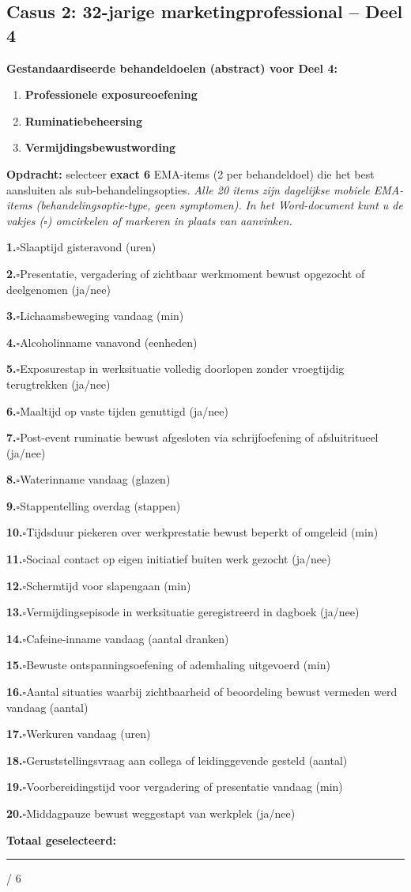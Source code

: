\documentclass[11pt,a4paper]{article}
\newcommand{\checkitemBFS}[2]{%
\noindent\small\textbf{#1.}\hspace{0.45em}$\square$\hspace{0.4em}#2\par\vspace{0.20em}}
\begin{document}
\vspace{0.6em}
\newpage
\subsection*{Casus 2: 32-jarige marketingprofessional -- Deel 4}

\begin{contextbox}
\small\textbf{Gestandaardiseerde behandeldoelen (abstract) voor Deel 4:}
\begin{enumerate}[topsep=2pt,itemsep=1pt,label=\arabic*.]
\item \textbf{Professionele exposureoefening}
\item \textbf{Ruminatiebeheersing}
\item \textbf{Vermijdingsbewustwording}
\end{enumerate}
\end{contextbox}

\begin{responsebox}
\small\textbf{Opdracht:} selecteer \textbf{exact 6} EMA-items (2 per behandeldoel) die het best aansluiten als sub-behandelingsopties.
\textit{Alle 20 items zijn dagelijkse mobiele EMA-items (behandelingsoptie-type, geen symptomen).}
\textit{In het Word-document kunt u de vakjes ($\square$) omcirkelen of markeren in plaats van aanvinken.}

\checkitemBFS{1}{Slaaptijd gisteravond (uren)}
\checkitemBFS{2}{Presentatie, vergadering of zichtbaar werkmoment bewust opgezocht of deelgenomen (ja/nee)}
\checkitemBFS{3}{Lichaamsbeweging vandaag (min)}
\checkitemBFS{4}{Alcoholinname vanavond (eenheden)}
\checkitemBFS{5}{Exposurestap in werksituatie volledig doorlopen zonder vroegtijdig terugtrekken (ja/nee)}
\checkitemBFS{6}{Maaltijd op vaste tijden genuttigd (ja/nee)}
\checkitemBFS{7}{Post-event ruminatie bewust afgesloten via schrijfoefening of afsluitritueel (ja/nee)}
\checkitemBFS{8}{Waterinname vandaag (glazen)}
\checkitemBFS{9}{Stappentelling overdag (stappen)}
\checkitemBFS{10}{Tijdsduur piekeren over werkprestatie bewust beperkt of omgeleid (min)}
\checkitemBFS{11}{Sociaal contact op eigen initiatief buiten werk gezocht (ja/nee)}
\checkitemBFS{12}{Schermtijd voor slapengaan (min)}
\checkitemBFS{13}{Vermijdingsepisode in werksituatie geregistreerd in dagboek (ja/nee)}
\checkitemBFS{14}{Cafeine-inname vandaag (aantal dranken)}
\checkitemBFS{15}{Bewuste ontspanningsoefening of ademhaling uitgevoerd (min)}
\checkitemBFS{16}{Aantal situaties waarbij zichtbaarheid of beoordeling bewust vermeden werd vandaag (aantal)}
\checkitemBFS{17}{Werkuren vandaag (uren)}
\checkitemBFS{18}{Geruststellingsvraag aan collega of leidinggevende gesteld (aantal)}
\checkitemBFS{19}{Voorbereidingstijd voor vergadering of presentatie vandaag (min)}
\checkitemBFS{20}{Middagpauze bewust weggestapt van werkplek (ja/nee)}
\vspace{0.4em}
\noindent\textbf{Totaal geselecteerd:}\hspace{0.5em}\rule{1.2cm}{0.25pt}\hspace{0.2em}/ 6
\end{responsebox}
\end{document}
